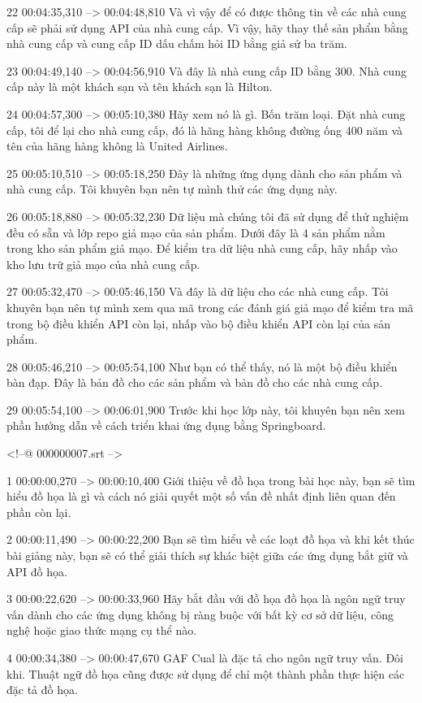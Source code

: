 22
00:04:35,310 --> 00:04:48,810
Và vì vậy để có được thông tin về các nhà cung cấp sẽ phải sử dụng API của nhà cung cấp.  Vì vậy, hãy thay thế sản phẩm bằng nhà cung cấp và cung cấp ID dấu chấm hỏi ID bằng giả sử ba trăm.

23
00:04:49,140 --> 00:04:56,910
Và đây là nhà cung cấp ID bằng 300. Nhà cung cấp này là một khách sạn và tên khách sạn là Hilton.

24
00:04:57,300 --> 00:05:10,380
Hãy xem nó là gì.  Bốn trăm loại.  Đặt nhà cung cấp, tôi để lại cho nhà cung cấp, đó là hãng hàng không đường ống 400 năm và tên của hãng hàng không là United Airlines.

25
00:05:10,510 --> 00:05:18,250
Đây là những ứng dụng dành cho sản phẩm và nhà cung cấp.  Tôi khuyên bạn nên tự mình thử các ứng dụng này.

26
00:05:18,880 --> 00:05:32,230
Dữ liệu mà chúng tôi đã sử dụng để thử nghiệm đều có sẵn và lớp repo giả mạo của sản phẩm.  Dưới đây là 4 sản phẩm nằm trong kho sản phẩm giả mạo. Để kiểm tra dữ liệu nhà cung cấp, hãy nhấp vào kho lưu trữ giả mạo của nhà cung cấp.

27
00:05:32,470 --> 00:05:46,150
Và đây là dữ liệu cho các nhà cung cấp.  Tôi khuyên bạn nên tự mình xem qua mã trong các đánh giá giả mạo để kiểm tra mã trong bộ điều khiển API còn lại, nhấp vào bộ điều khiển API còn lại của sản phẩm.

28
00:05:46,210 --> 00:05:54,100
Như bạn có thể thấy, nó là một bộ điều khiển bàn đạp.  Đây là bản đồ cho các sản phẩm và bản đồ cho các nhà cung cấp.

29
00:05:54,100 --> 00:06:01,900
Trước khi học lớp này, tôi khuyên bạn nên xem phần hướng dẫn về cách triển khai ứng dụng bằng Springboard.

<!--@ 000000007.srt -->

1
00:00:00,270 --> 00:00:10,400
Giới thiệu về đồ họa trong bài học này, bạn sẽ tìm hiểu đồ họa là gì và cách nó giải quyết một số vấn đề nhất định liên quan đến phần còn lại.

2
00:00:11,490 --> 00:00:22,200
Bạn sẽ tìm hiểu về các loạt đồ họa và khi kết thúc bài giảng này, bạn sẽ có thể giải thích sự khác biệt giữa các ứng dụng bắt giữ và API đồ họa.

3
00:00:22,620 --> 00:00:33,960
Hãy bắt đầu với đồ họa đồ họa là ngôn ngữ truy vấn dành cho các ứng dụng không bị ràng buộc với bất kỳ cơ sở dữ liệu, công nghệ hoặc giao thức mạng cụ thể nào.

4
00:00:34,380 --> 00:00:47,670
GAF Cual là đặc tả cho ngôn ngữ truy vấn.  Đôi khi.  Thuật ngữ đồ họa cũng được sử dụng để chỉ một thành phần thực hiện các đặc tả đồ họa.

